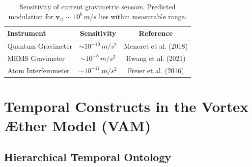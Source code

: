 \documentclass[preprint]{revtex4-2}
\begin{document}
    \begin{table}[h!]
        \centering
        \begin{tabular}{|l|c|c|}
            \hline
            \textbf{Instrument} & \textbf{Sensitivity} & \textbf{Reference} \\
            \hline
            Quantum Gravimeter & \( \sim 10^{-10} \, \si{m/s^2} \) & Menoret et al. (2018) \\
            MEMS Gravimeter & \( \sim 10^{-8} \, \si{m/s^2} \) & Hwang et al. (2021) \\
            Atom Interferometer & \( \sim 10^{-11} \, \si{m/s^2} \) & Freier et al. (2016) \\
            \hline
        \end{tabular}
        \caption{Sensitivity of current gravimetric sensors. Predicted modulation for \( \mathbf{v}_{\scriptscriptstyle\boldsymbol{\circlearrowleft}} \sim 10^6\, \si{m/s} \) lies within measurable range.}
    \end{table}


%
%
%
\section{Temporal Constructs in the Vortex Æther Model (VAM)}\label{sec:temporal-constructs-in-the-vortex-ther-model-(vam)}

\begin{abstract}
This appendix defines and formalizes temporal constructs crucial to the Vortex Æther Model (VAM). By introducing a structured temporal ontology—from absolute universal time (Æther-Time) to locally measurable constructs (Chronos-Time, Swirl Clocks, Vortex Proper Time) and critical transition events (Kairos Moments)—we clarify the dynamics of temporality within structured vortex fields. These constructs form the temporal-topological triad supporting VAM's description of mass, gravity, and quantum phenomena.
\end{abstract}

\subsection{Hierarchical Temporal Ontology}
\end{document}
